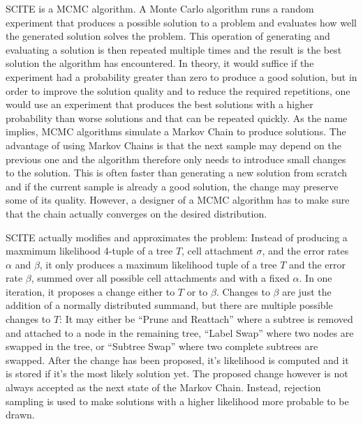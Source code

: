 \ac{SCITE} is a \ac{MCMC} algorithm. A Monte Carlo algorithm runs a random experiment that produces a possible solution to a problem and evaluates how well the generated solution solves the problem. This operation of generating and evaluating a solution is then repeated multiple times and the result is the best solution the algorithm has encountered. In theory, it would suffice if the experiment had a probability greater than zero to produce a good solution, but in order to improve the solution quality and to reduce the required repetitions, one would use an experiment that produces the best solutions with a higher probability than worse solutions and that can be repeated quickly. As the name implies, \ac{MCMC} algorithms simulate a Markov Chain to produce solutions. The advantage of using Markov Chains is that the next sample may depend on the previous one and the algorithm therefore only needs to introduce small changes to the solution. This is often faster than generating a new solution from scratch and if the current sample is already a good solution, the change may preserve some of its quality. However, a designer of a \ac{MCMC} algorithm has to make sure that the chain actually converges on the desired distribution.

\ac{SCITE} actually modifies and approximates the problem: Instead of producing a maxmimum likelihood 4-tuple of a tree $T$, cell attachment $\sigma$, and the error rates $\alpha$ and $\beta$, it only produces a maximum likelihood tuple of a tree $T$ and the error rate $\beta$, summed over all possible cell attachments and with a fixed $\alpha$. In one iteration, it proposes a change either to $T$ or to $\beta$. Changes to $\beta$ are just the addition of a normally distributed summand, but there are multiple possible changes to $T$: It may either be ``Prune and Reattach'' where a subtree is removed and attached to a node in the remaining tree, ``Label Swap'' where two nodes are swapped in the tree, or ``Subtree Swap'' where two complete subtrees are swapped. After the change has been proposed, it's likelihood is computed and it is stored if it's the most likely solution yet. The proposed change however is not always accepted as the next state of the Markov Chain. Instead, rejection sampling is used to make solutions with a higher likelihood more probable to be drawn.

